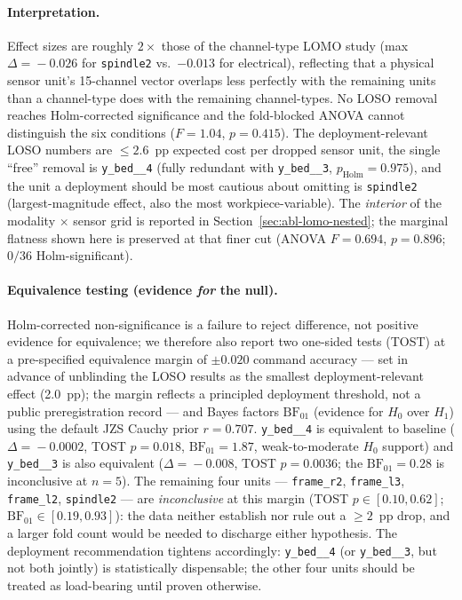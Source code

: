 \documentclass[11pt,a4paper]{article}
\begin{document}
\paragraph{Interpretation.} Effect sizes are roughly $2\times$ those of
the channel-type LOMO study (max $\Delta\!=\!-0.026$ for \texttt{spindle2}
vs.\ $-0.013$ for electrical), reflecting
that a physical sensor unit's 15-channel vector overlaps less perfectly
with the remaining units than a channel-type does with the remaining
channel-types. No LOSO removal reaches Holm-corrected significance and
the fold-blocked ANOVA cannot distinguish the six conditions
($F\!=\!1.04$, $p\!=\!0.415$). The deployment-relevant LOSO numbers are
$\le\!2.6$~pp expected cost per dropped sensor unit, the single
``free'' removal is \texttt{y\_bed\_\_4} (fully redundant with
\texttt{y\_bed\_\_3}, $p_{\text{Holm}}\!=\!0.975$), and the unit a
deployment should be most cautious about omitting is \texttt{spindle2}
(largest-magnitude effect, also the most workpiece-variable). The
\emph{interior} of the modality $\times$ sensor grid is reported in
Section~\ref{sec:abl-lomo-nested}; the marginal flatness shown here is
preserved at that finer cut (ANOVA $F\!=\!0.694$, $p\!=\!0.896$;
$0/36$ Holm-significant).

\paragraph{Equivalence testing (evidence \emph{for} the null).} Holm-corrected non-significance is a failure to reject difference, not positive evidence for equivalence; we therefore also report two one-sided tests (TOST) at a pre-specified equivalence margin of $\pm 0.020$ command accuracy --- set in advance of unblinding the LOSO results as the smallest deployment-relevant effect (2.0~pp); the margin reflects a principled deployment threshold, not a public preregistration record --- and Bayes factors $\mathrm{BF}_{01}$ (evidence for $H_0$ over $H_1$) using the default JZS Cauchy prior $r\!=\!0.707$. \texttt{y\_bed\_\_4} is equivalent to baseline ($\Delta\!=\!-0.0002$, TOST $p\!=\!0.018$, $\mathrm{BF}_{01}\!=\!1.87$, weak-to-moderate $H_0$ support) and \texttt{y\_bed\_\_3} is also equivalent ($\Delta\!=\!-0.008$, TOST $p\!=\!0.0036$; the $\mathrm{BF}_{01}\!=\!0.28$ is inconclusive at $n\!=\!5$). The remaining four units --- \texttt{frame\_r2}, \texttt{frame\_l3}, \texttt{frame\_l2}, \texttt{spindle2} --- are \emph{inconclusive} at this margin (TOST $p\!\in\![0.10, 0.62]$; $\mathrm{BF}_{01}\!\in\![0.19, 0.93]$): the data neither establish nor rule out a $\ge 2$~pp drop, and a larger fold count would be needed to discharge either hypothesis. The deployment recommendation tightens accordingly: \texttt{y\_bed\_\_4} (or \texttt{y\_bed\_\_3}, but not both jointly) is statistically dispensable; the other four units should be treated as load-bearing until proven otherwise.
\end{document}
